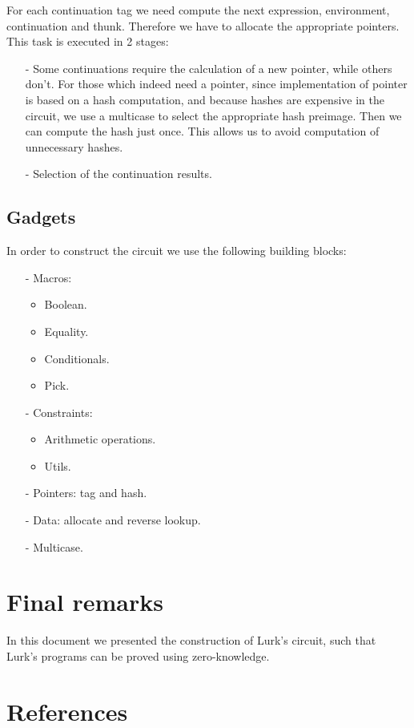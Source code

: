 \documentclass[10pt, english]{article}
\begin{document}
For each continuation tag we need compute the next expression, environment, continuation and thunk. Therefore we have to allocate the appropriate pointers. This task is executed in 2 stages:

\begin{itemize}
	\item[-] Some continuations require the calculation of a new pointer, while others don't. For those which indeed need a pointer, since implementation of pointer is based on a hash computation, and because hashes are expensive in the circuit, we use a multicase to select the appropriate hash preimage. Then we can compute the hash just once. This allows us to avoid computation of unnecessary hashes.
	\item[-] Selection of the continuation results.
\end{itemize}

\subsection{Gadgets}

In order to construct the circuit we use the following building blocks:

\begin{itemize}
	\item[-] Macros:
	\begin{itemize}
		\item Boolean.
	    \item Equality.
		\item Conditionals.
		\item Pick.
	\end{itemize}
	\item[-] Constraints:
	\begin{itemize}
        \item Arithmetic operations.
		\item Utils.
	\end{itemize}
	\item[-] Pointers: tag and hash.
    \item[-] Data: allocate and reverse lookup.
    \item[-] Multicase.
\end{itemize}

\section{Final remarks}

In this document we presented the construction of Lurk's circuit, such that Lurk's programs can be proved using zero-knowledge.

\section{References}




\end{document}
